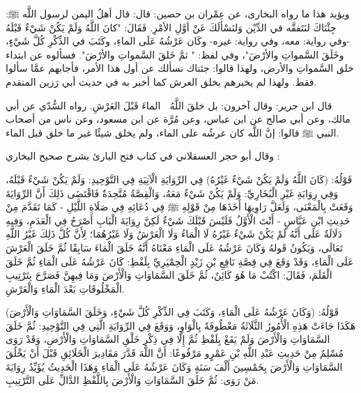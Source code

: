 ويؤيد هذا ما رواه البخارى، عن عِمْران بن حصين: قال: قال أهلُ اليمن لرسول اللَّه ﷺ: جِئْنَاكَ لنَتَفقَّه في الدِّيْن وَلنَسْألَكَ عَنْ أوَّلِ الأمْرِ. فَقَالَ: "كانَ اللَّهُ وَلَمْ يَكُنْ شَيْءٌ قَبْلَهُ -وفي رواية: معه، وفي رواية: غيره- وكَان عَرْشُهُ عَلَى الماءِ، وكَتَبَ في الذِّكْرِ كُلَّ شَيْءٍ، وخَلَقَ السَّمواتِ والأرْضَ"، وفي لفظ: " ثمَّ خَلقَ السَّمواتِ والأرْضَ". فسألوه عن ابتداء خلق السَّمواتِ والأرض، ولهذا قالوا: جئناك نسألك عن أول هذا الأمر، فأجابهم عمَّا سألوا فقط. ولهذا لم يخبرهم بخلق العرش كما أخبر به في حديث أبي رَزين المتقدم.

قال ابن جرير: وقال آخرون: بل خلقَ اللَّهُ ﷿ الماءَ قَبْلَ العَرْشِ. رواه السُّدّي عن أبي مالك، وعن أبي صالح عن ابن عباس، وعن مُرَّة عن ابن مسعود، وعن ناس من أصحاب النبي ﷺ قالوا: إنَّ اللَّه كان عرشُه على الماء، ولم يخلق شيئًا غير ما خلق قبل الماء.

وقال أبو حجر العسقلاني في كتاب فتح البارئ بشرح صحيح البخاري \href{https://shamela.ws/book/1673/3483#p2}{\faExternalLink}: 



قَوْلُهُ: (كَانَ اللَّهُ وَلَمْ يَكُنْ شَيْءٌ غَيْرُهُ) فِي الرِّوَايَةِ الْآتِيَةِ فِي التَّوْحِيدِ: وَلَمْ يَكُنْ شَيْءٌ قَبْلَهُ، وَفِي رِوَايَةِ غَيْرِ الْبُخَارِيِّ: وَلَمْ يَكُنْ شَيْءٌ مَعَهُ، وَالْقِصَّةُ مُتَّحِدَةٌ فَاقْتَضَى ذَلِكَ أَنَّ الرِّوَايَةَ وَقَعَتْ بِالْمَعْنَى، وَلَعَلَّ رَاوِيهَا أَخَذَهَا مِنْ قَوْلِهِ ﷺ فِي دُعَائِهِ فِي صَلَاةِ اللَّيْلِ - كَمَا تَقَدَّمَ مِنْ حَدِيثِ ابْنِ عَبَّاسٍ - أَنْتَ الْأَوَّلُ فَلَيْسَ قَبْلَكَ شَيْءٌ لَكِنَّ رِوَايَةَ الْبَابِ أَصْرَحُ فِي الْعَدَمِ، وَفِيهِ دَلَالَةٌ عَلَى أَنَّهُ لَمْ يَكُنْ شَيْءٌ غَيْرُهُ لَا الْمَاءُ وَلَا الْعَرْشُ وَلَا غَيْرُهُمَا؛ لِأَنَّ كُلَّ ذَلِكَ غَيْرُ اللَّهِ تَعَالَى، وَيَكُونُ قَولهُ وَكَانَ عَرْشُهُ عَلَى الْمَاءِ مَعْنَاهُ أَنَّهُ خَلَقَ الْمَاءَ سَابِقًا ثُمَّ خَلَقَ الْعَرْشَ عَلَى الْمَاءِ، وَقَدْ وَقَعَ فِي قِصَّةِ نَافِعِ بْنِ زَيْدٍ الْحِمْيَرِيِّ بِلَفْظِ: كَانَ عَرْشُهُ عَلَى الْمَاءِ ثُمَّ خَلَقَ الْقَلَمَ، فَقَالَ: اكْتُبْ مَا هُوَ كَائِنٌ، ثُمَّ خَلَقَ السَّمَاوَاتِ وَالْأَرْضَ وَمَا فِيهِنَّ فَصَرَّحَ بِتَرْتِيبِ الْمَخْلُوقَاتِ بَعْدَ الْمَاءِ وَالْعَرْشِ.

قَوْلُهُ: (وَكَانَ عَرْشُهُ عَلَى الْمَاءِ، وَكَتَبَ فِي الذِّكْرِ كُلَّ شَيْءٍ، وَخَلَقَ السَّمَاوَاتِ وَالْأَرْضَ) هَكَذَا جَاءَتْ هَذِهِ الْأُمُورُ الثَّلَاثَةُ مَعْطُوفَةً بِالْوَاوِ، وَوَقَعَ فِي الرِّوَايَةِ الَّتِي فِي التَّوْحِيدِ: ثُمَّ خَلَقَ السَّمَاوَاتِ وَالْأَرْضَ وَلَمْ يَقَعْ بِلَفْظِ ثُمَّ إِلَّا فِي ذِكْرِ خَلْقِ السَّمَاوَاتِ وَالْأَرْضِ، وَقَدْ رَوَى مُسْلِمٌ مِنْ حَدِيثِ عَبْدِ اللَّهِ بْنِ عَمْرٍو مَرْفُوعًا: أَنَّ اللَّهَ قَدَّرَ مَقَادِيرَ الْخَلَائِقِ قَبْلَ أَنْ يَخْلُقَ السَّمَاوَاتِ وَالْأَرْضَ بِخَمْسِينَ أَلْفَ سَنَةٍ وَكَانَ عَرْشُهُ عَلَى الْمَاءِ وَهَذَا الْحَدِيثُ يُؤَيِّدُ رِوَايَةَ مَنْ رَوَى: ثُمَّ خَلَقَ السَّمَاوَاتِ وَالْأَرْضَ بِاللَّفْظِ الدَّالِّ عَلَى التَّرْتِيبِ.

